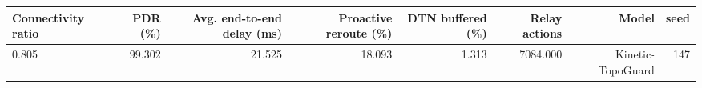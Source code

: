 \begin{tabular}{lrrrrrrr}
\toprule
Connectivity ratio & PDR (\%) & Avg. end-to-end delay (ms) & Proactive reroute (\%) & DTN buffered (\%) & Relay actions & Model & seed \\
\midrule
0.805 & 99.302 & 21.525 & 18.093 & 1.313 & 7084.000 & Kinetic-TopoGuard & 147 \\
\bottomrule
\end{tabular}